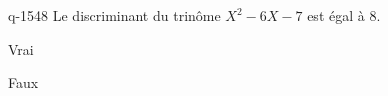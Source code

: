 \begin{truefalse}{q-1548}
Le discriminant du trinôme $X^2-6X-7$ est égal à $8$.
\item Vrai
\item* Faux
\end{truefalse}

